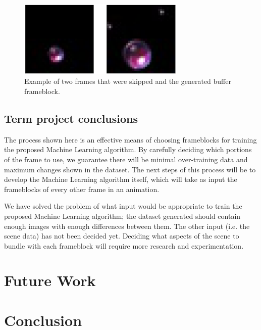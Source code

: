 \documentclass[conference]{IEEEtran}
\begin{document}
\begin{figure}[htbp]
\centerline{\includegraphics[width=8cm]{frameblock_pair.png}}
\caption{Example of two frames that were skipped and the generated buffer frameblock.}
\label{fig:frameblock_pair}
\end{figure}

\subsection{Term project conclusions}
\label{subsec:term_conclusions}
The process shown here is an effective means of choosing frameblocks
for training the proposed Machine Learning algorithm.
By carefully deciding which portions of the frame to use,
we guarantee there will be minimal over-training data and maximum changes shown in the dataset.
The next steps of this process will be to develop the Machine Learning algorithm itself,
which will take as input the frameblocks of every other frame in an animation.

We have solved the problem of what input would be appropriate to train
the proposed Machine Learning algorithm;
the dataset generated should contain enough images with enough differences between them.
The other input (i.e. the scene data) has not been decided yet.
Deciding what aspects of the scene to bundle with each frameblock will require more research and experimentation.

\section{Future Work}

\section{Conclusion}

\end{document}
